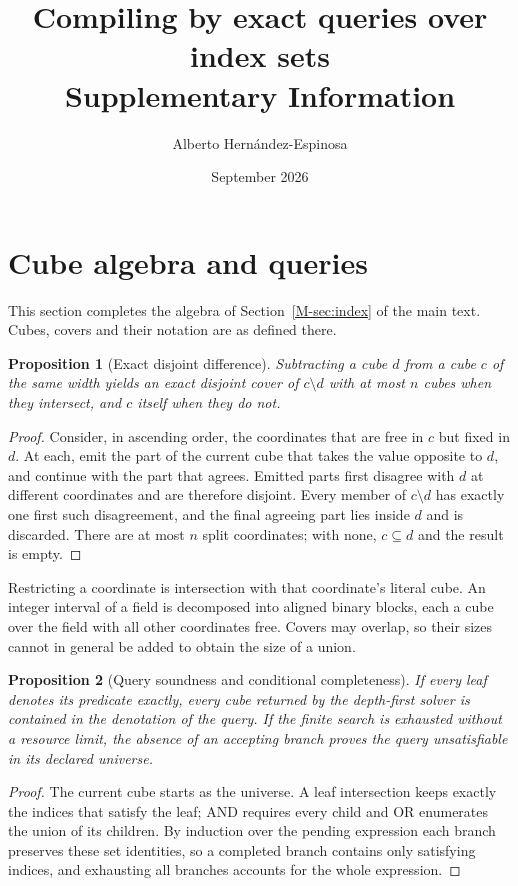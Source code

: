 \documentclass[11pt,a4paper]{article}
\title{Compiling by exact queries over index sets\\[4pt]\large Supplementary Information}
\author{Alberto Hern\'andez-Espinosa}
\date{September 2026}
\newtheorem{proposition}{Proposition}
\begin{document}
\maketitle
\tableofcontents

\section{Cube algebra and queries}\label{sec:algebra}

This section completes the algebra of Section~\ref{M-sec:index} of the main text.
Cubes, covers and their notation are as defined there.

\begin{proposition}[Exact disjoint difference]
Subtracting a cube $d$ from a cube $c$ of the same width yields an exact disjoint
cover of $c\setminus d$ with at most $n$ cubes when they intersect, and $c$
itself when they do not.
\end{proposition}
\begin{proof}
Consider, in ascending order, the coordinates that are free in $c$ but fixed in
$d$. At each, emit the part of the current cube that takes the value opposite to
$d$, and continue with the part that agrees. Emitted parts first disagree with $d$
at different coordinates and are therefore disjoint. Every member of $c\setminus
d$ has exactly one first such disagreement, and the final agreeing part lies
inside $d$ and is discarded. There are at most $n$ split coordinates; with none,
$c\subseteq d$ and the result is empty.
\end{proof}

Restricting a coordinate is intersection with that coordinate's literal cube. An
integer interval of a field is decomposed into aligned binary blocks, each a cube
over the field with all other coordinates free. Covers may overlap, so their
sizes cannot in general be added to obtain the size of a union.

\begin{proposition}[Query soundness and conditional completeness]
If every leaf denotes its predicate exactly, every cube returned by the
depth-first solver is contained in the denotation of the query. If the finite
search is exhausted without a resource limit, the absence of an accepting branch
proves the query unsatisfiable in its declared universe.
\end{proposition}
\begin{proof}
The current cube starts as the universe. A leaf intersection keeps exactly the
indices that satisfy the leaf; AND requires every child and OR enumerates the
union of its children. By induction over the pending expression each branch
preserves these set identities, so a completed branch contains only satisfying
indices, and exhausting all branches accounts for the whole expression.
\end{proof}
\end{document}
